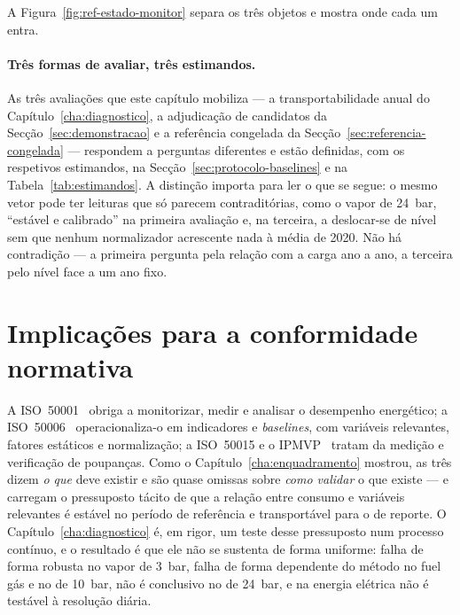 A Figura~\ref{fig:ref-estado-monitor} separa os três objetos e mostra onde cada um entra.


\paragraph{Três formas de avaliar, três estimandos.} As três avaliações que
este capítulo mobiliza --- a transportabilidade anual do
Capítulo~\ref{cha:diagnostico}, a adjudicação de candidatos da
Secção~\ref{sec:demonstracao} e a referência congelada da
Secção~\ref{sec:referencia-congelada} --- respondem a perguntas diferentes
e estão definidas, com os respetivos estimandos, na
Secção~\ref{sec:protocolo-baselines} e na Tabela~\ref{tab:estimandos}. A
distinção importa para ler o que se segue: o mesmo vetor pode ter leituras
que só parecem contraditórias, como o vapor de 24~bar, ``estável e
calibrado'' na primeira avaliação e, na terceira, a deslocar-se de nível sem
que nenhum normalizador acrescente nada à média de 2020. Não há contradição
--- a primeira pergunta pela relação com a carga ano a ano, a terceira pelo
nível face a um ano fixo.


\section{Implicações para a conformidade normativa}
\label{sec:implicacoes-normativas}

A ISO~50001~\cite{ISO50001_2018} obriga a monitorizar, medir e analisar o
desempenho energético; a ISO~50006~\cite{ISO50006_2014} operacionaliza-o em
indicadores e \emph{baselines}, com variáveis relevantes, fatores estáticos
e normalização; a ISO~50015 e o IPMVP~\cite{ISO50015_2014,IPMVP_2022} tratam
da medição e verificação de poupanças. Como o Capítulo~\ref{cha:enquadramento}
mostrou, as três dizem \emph{o que} deve existir e são quase omissas sobre
\emph{como validar} o que existe --- e carregam o pressuposto tácito de que a
relação entre consumo e variáveis relevantes é estável no período de
referência e transportável para o de reporte. O Capítulo~\ref{cha:diagnostico}
é, em rigor, um teste desse pressuposto num processo contínuo, e o resultado
é que ele não se sustenta de forma uniforme: falha de forma robusta no vapor
de 3~bar, falha de forma dependente do método no fuel gás e no de 10~bar,
não é conclusivo no de 24~bar, e na energia elétrica não é testável à
resolução diária.

